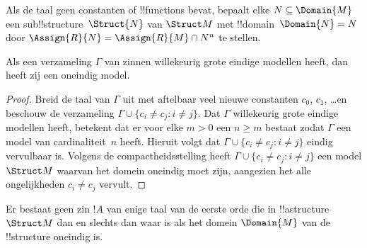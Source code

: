 \documentclass[openany]{memoir}
\begin{document}
\begin{rem}
Als de taal geen constanten of !!{function}s bevat, bepaalt elke $N
\subseteq \Domain{M}$ een sub!!{structure}~$\Struct{N}$ van
$\Struct M$ met !!{domain}~$\Domain{N} = N$ door $\Assign{R}{N} =
\Assign{R}{M} \cap N^n$ te stellen.
\end{rem}

\endgroup

\begingroup
\def\olfilename{OLP-0186}
\def\olfilepath{content/model-theory/basics/}
\hypertarget{unit-OLP-0186}{}




\begin{thm}
 Als een verzameling $\Gamma$ van zinnen willekeurig
grote eindige modellen heeft, dan heeft zij een oneindig model.
\end{thm}

\begin{proof}
Breid de taal van $\Gamma$ uit met aftelbaar veel nieuwe constanten
$c_0$, $c_1$, \dots en beschouw de verzameling $\Gamma \cup \{c_i \neq c_j :
i \neq j\}$. Dat $\Gamma$ willekeurig grote eindige modellen heeft,
betekent dat er voor elke $m >0$ een $n\ge m$ bestaat zodat $\Gamma$ een
model van cardinaliteit~$n$ heeft. Hieruit volgt dat $\Gamma \cup \{c_i \neq
c_j : i \neq j\}$ eindig vervulbaar is. Volgens de compactheidsstelling
heeft $\Gamma \cup \{c_i \neq c_j : i \neq j\}$ een model $\Struct M$
waarvan het domein oneindig moet zijn, aangezien het alle ongelijkheden
$c_i \neq c_j$ vervult.
\end{proof}

\begin{prop}
Er bestaat geen zin $!A$ van enige taal van de eerste orde die in
!!a{structure}~$\Struct M$ dan en slechts dan waar is als het domein
$\Domain{M}$ van de !!{structure} oneindig is.
\end{prop}
\end{document}
